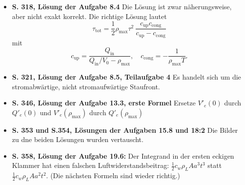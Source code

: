 \documentclass[11pt,a4paper]{scrartcl}
\providecommand{\bdm}{\begin{displaymath}}
\providecommand{\edm}{\end{displaymath}}
\providecommand{\3}{{\ss}}
\begin{document}
\begin{itemize}
\item
\textbf{S. 318, L\"osung der Aufgabe 8.4} Die L\"osung ist zwar
n\"aherungsweise, aber nicht exakt korrekt. Die richtige L\"osung
lautet
\bdm
\tau_\text{tot}=\frac{1}{2}\rho_\text{max}\tau^2 \ 
\frac{c_\text{up}c_\text{cong}}{c_\text{up}-c_\text{cong}}
\edm
mit
\bdm
c_\text{up}=\frac{Q_\text{in}}{Q_\text{in}/V_0-\rho_\text{max}}, \quad
c_\text{cong}=-\frac{1}{\rho_\text{max}T}.
\edm

\item
\textbf{S. 321, L\"osung der Aufgabe 8.5, Teilaufgabe 4} Es handelt
sich um die stromabw\"artige, nicht stromaufw\"artige Staufront.

\item
\textbf{S. 346, L\"osung der Aufgabe 13.3, erste Formel}
Ersetze $V'_e(0)$ durch $Q'_e(0)$ und $V'_e(\rho_\text{max})$ durch $Q'_e(\rho_\text{max})$

\item
\textbf{S. 353 und S.354, L\"osungen der Aufgaben 15.8 und 18:2} Die Bilder zu dne beiden L\"osungen wurden vertauscht. 

\item
\textbf{S. 358, L\"osung der Aufgabe 19.6:} Der Integrand in der
ersten eckigen Klammer hat einen falschen Luftwiderstandsbeitrag: 
$\frac{1}{2} c_w \rho_L A a^3t^3$ statt
$\frac{1}{2} c_w \rho_L A a^2t^2$. (Die n\"achsten Formeln sind wieder
richtig.)

\end{itemize}
\end{document}
